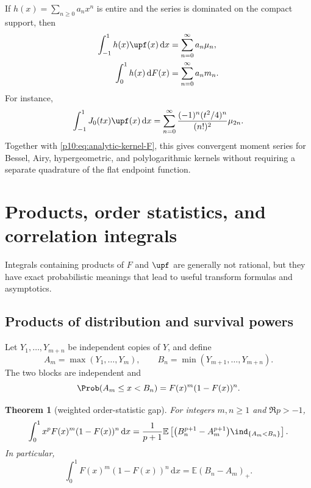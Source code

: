 \documentclass[11pt,oneside]{article}
\newtheorem{theorem}{Theorem}[section]
\theoremstyle{definition}
\theoremstyle{remark}
\newcommand{\F}{F}
\newcommand{\E}{\mathbb E}
\newcommand{\dd}{\,\mathrm d}
\newcommand{\1}{\mathbf 1}
\begin{document}
If \(h(x)=\sum_{n\ge0}a_nx^n\) is entire and the series is dominated on the compact
support, then
\begin{align}
 \int_{-1}^1h(x)\upf(x)\dd x
 &=\sum_{n=0}^{\infty}a_n\mu_n,
 \label{p10:eq:entire-kernel-up}\\
 \int_0^1h(x)\dd\F(x)
 &=\sum_{n=0}^{\infty}a_nm_n.
 \label{p10:eq:entire-kernel-dF}
\end{align}
For instance,
\begin{equation}\label{p10:eq:Bessel-up}
 \int_{-1}^1J_0(tx)\upf(x)\dd x
 =\sum_{n=0}^{\infty}
 \frac{(-1)^n(t^2/4)^n}{(n!)^2}\mu_{2n}.
\end{equation}
Together with \cref{p10:eq:analytic-kernel-F}, this gives convergent moment series for
Bessel, Airy, hypergeometric, and polylogarithmic kernels without requiring a separate
quadrature of the flat endpoint function.

\section{Products, order statistics, and correlation integrals}

Integrals containing products of \(\F\) and \(\upf\) are generally not rational, but
they have exact probabilistic meanings that lead to useful transform formulas and
asymptotics.

\subsection{Products of distribution and survival powers}

Let \(Y_1,\ldots,Y_{m+n}\) be independent copies of \(Y\), and define
\begin{equation}\label{p10:eq:Amax-Bmin}
 A_m=\max(Y_1,\ldots,Y_m),
 \qquad
 B_n=\min(Y_{m+1},\ldots,Y_{m+n}).
\end{equation}
The two blocks are independent and
\begin{equation}\label{p10:eq:gap-event}
 \Prob(A_m\le x<B_n)=\F(x)^m(1-\F(x))^n.
\end{equation}

\begin{theorem}[weighted order-statistic gap]\label{p10:thm:order-gap}
For integers \(m,n\ge1\) and \(\Re p>-1\),
\begin{equation}\label{p10:eq:weighted-gap}
 \int_0^1x^p\F(x)^m(1-\F(x))^n\dd x
 =\frac1{p+1}\E\left[
 \bigl(B_n^{p+1}-A_m^{p+1}\bigr)\ind_{\{A_m<B_n\}}
 \right].
\end{equation}
In particular,
\begin{equation}\label{p10:eq:gap-unweighted}
 \int_0^1\F(x)^m(1-\F(x))^n\dd x
 =\E(B_n-A_m)_+.
\end{equation}
\end{theorem}
\end{document}
